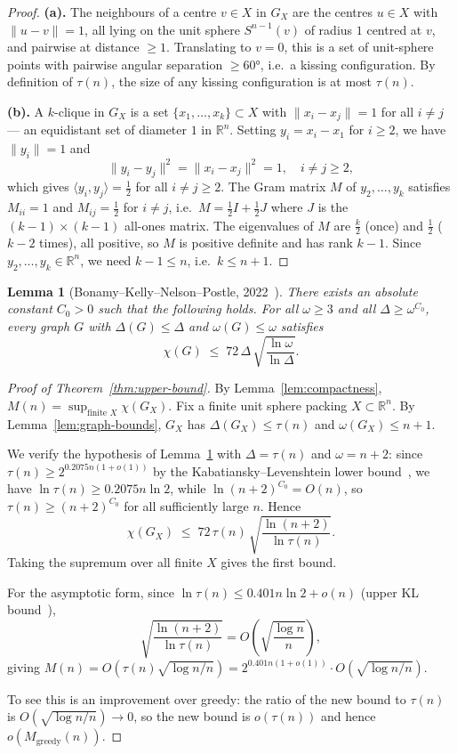 \documentclass{article}
\newtheorem{lemma}[theorem]{Lemma}
\theoremstyle{definition}
\begin{document}
\begin{proof}
\textbf{(a).} The neighbours of a centre $v\in X$ in $G_X$ are the centres $u\in X$ with $\|u-v\|=1$, all lying on the unit sphere $S^{n-1}(v)$ of radius $1$ centred at $v$, and pairwise at distance $\ge 1$.  Translating to $v=0$, this is a set of unit-sphere points with pairwise angular separation $\ge 60°$, i.e.\ a kissing configuration.  By definition of $\tau(n)$, the size of any kissing configuration is at most $\tau(n)$.

\textbf{(b).} A $k$-clique in $G_X$ is a set $\{x_1,\ldots,x_k\}\subset X$ with $\|x_i-x_j\|=1$ for all $i\ne j$ — an equidistant set of diameter $1$ in $\mathbb{R}^n$.  Setting $y_i=x_i-x_1$ for $i\ge 2$, we have $\|y_i\|=1$ and
\[
  \|y_i-y_j\|^2 = \|x_i-x_j\|^2 = 1, \quad i\ne j\ge 2,
\]
which gives $\langle y_i,y_j\rangle = \tfrac{1}{2}$ for all $i\ne j\ge 2$.  The Gram matrix $M$ of $y_2,\ldots,y_k$ satisfies $M_{ii}=1$ and $M_{ij}=\tfrac{1}{2}$ for $i\ne j$, i.e.\ $M=\tfrac{1}{2}I+\tfrac{1}{2}J$ where $J$ is the $(k-1)\times(k-1)$ all-ones matrix.  The eigenvalues of $M$ are $\tfrac{k}{2}$ (once) and $\tfrac{1}{2}$ ($k-2$ times), all positive, so $M$ is positive definite and has rank $k-1$.  Since $y_2,\ldots,y_k\in\mathbb{R}^n$, we need $k-1\le n$, i.e.\ $k\le n+1$.
\end{proof}

\begin{lemma}[Bonamy--Kelly--Nelson--Postle, 2022~{\cite{BKNP2022}}]\label{lem:bknp}
There exists an absolute constant $C_0>0$ such that the following holds.  For all $\omega\ge 3$ and all $\Delta\ge \omega^{C_0}$, every graph $G$ with $\Delta(G)\le\Delta$ and $\omega(G)\le\omega$ satisfies
\[
  \chi(G)\;\le\; 72\,\Delta\,\sqrt{\frac{\ln\omega}{\ln\Delta}}.
\]
\end{lemma}

\begin{proof}[Proof of Theorem~\ref{thm:upper-bound}]
By Lemma~\ref{lem:compactness}, $M(n)=\sup_{\text{finite }X}\chi(G_X)$.  Fix a finite unit sphere packing $X\subset\mathbb{R}^n$.  By Lemma~\ref{lem:graph-bounds}, $G_X$ has $\Delta(G_X)\le\tau(n)$ and $\omega(G_X)\le n+1$.

We verify the hypothesis of Lemma~\ref{lem:bknp} with $\Delta=\tau(n)$ and $\omega=n+2$: since $\tau(n)\ge 2^{0.2075n(1+o(1))}$ by the Kabatiansky--Levenshtein lower bound~\cite{KL1978}, we have $\ln\tau(n)\ge 0.2075n\ln 2$, while $\ln(n+2)^{C_0}=O(n)$, so $\tau(n)\ge(n+2)^{C_0}$ for all sufficiently large $n$.  Hence
\[
  \chi(G_X) \;\le\; 72\,\tau(n)\,\sqrt{\frac{\ln(n+2)}{\ln\tau(n)}}.
\]
Taking the supremum over all finite $X$ gives the first bound.

For the asymptotic form, since $\ln\tau(n)\le 0.401n\ln 2+o(n)$ (upper KL bound~\cite{KL1978}),
\[
  \sqrt{\frac{\ln(n+2)}{\ln\tau(n)}} = O\!\left(\sqrt{\frac{\log n}{n}}\right),
\]
giving $M(n)=O(\tau(n)\sqrt{\log n/n})=2^{0.401n(1+o(1))}\cdot O(\sqrt{\log n/n})$.

To see this is an improvement over greedy: the ratio of the new bound to $\tau(n)$ is $O(\sqrt{\log n/n})\to 0$, so the new bound is $o(\tau(n))$ and hence $o(M_{\mathrm{greedy}}(n))$.
\end{proof}
\end{document}
